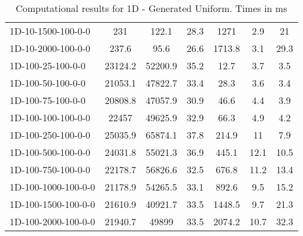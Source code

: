 \documentclass{article}
\begin{document}
\begin{table}[h]
\begin{center}
\begin{tabular}{|l||c|c|c|c|c|c|}
            1D-10-1500-100-0-0                     & 231     & 122.1      & 28.3       & 1271        & 2.9       & 21         \\
            1D-10-2000-100-0-0                     & 237.6   & 95.6       & 26.6       & 1713.8      & 3.1       & 29.3       \\
            \hline
            1D-100-25-100-0-0                       & 23124.2 & 52200.9    & 35.2       & 12.7        & 3.7       & 3.5        \\
            1D-100-50-100-0-0                       & 21053.1 & 47822.7    & 33.4       & 28.3        & 3.6       & 3.4        \\
            1D-100-75-100-0-0                       & 20808.8 & 47057.9    & 30.9       & 46.6        & 4.4       & 3.9        \\
            1D-100-100-100-0-0                      & 22457   & 49625.9    & 32.9       & 66.3        & 4.9       & 4.2        \\
            1D-100-250-100-0-0                      & 25035.9 & 65874.1    & 37.8       & 214.9       & 11        & 7.9        \\
            1D-100-500-100-0-0                      & 24031.8 & 55021.3    & 36.9       & 445.1       & 12.1      & 10.5       \\
            1D-100-750-100-0-0                      & 22178.7 & 56826.6    & 32.5       & 676.8       & 11.2      & 13.4       \\
            1D-100-1000-100-0-0                     & 21178.9 & 54265.5    & 33.1       & 892.6       & 9.5       & 15.2       \\
            1D-100-1500-100-0-0                     & 21610.9 & 40921.7    & 33.5       & 1448.5      & 9.7       & 21.3       \\
            1D-100-2000-100-0-0                     & 21940.7 & 49899      & 33.5       & 2074.2      & 10.7      & 32.3       \\
            \hline
        \end{tabular}
    \end{center}
        \caption{Computational results for 1D - Generated Uniform. Times in ms}
    \end{table}
\end{document}
